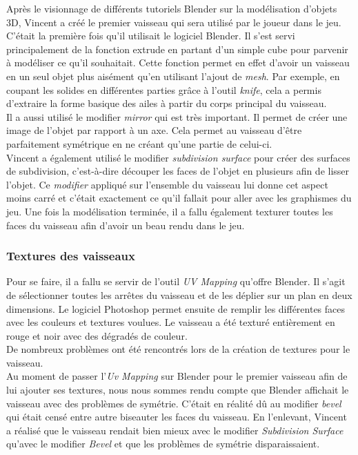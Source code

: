 \documentclass[12pt, titlepage]{article}
\begin{document}
\begin{spacing}{1.5}
Après le visionnage de différents tutoriels Blender sur la modélisation d'objets 3D, Vincent a créé le premier vaisseau qui sera utilisé par le joueur dans le jeu. C'était la première fois qu'il utilisait le logiciel Blender. Il s'est servi principalement de la fonction extrude en partant d'un simple cube pour parvenir à modéliser ce qu'il souhaitait. Cette fonction permet en effet d'avoir un vaisseau en un seul objet plus aisément qu'en utilisant l'ajout de \textit{mesh}. Par exemple, en coupant les solides en différentes parties grâce à l'outil \textit{knife}, cela a permis d'extraire la forme basique des ailes à partir du corps principal du vaisseau.\\

Il a aussi utilisé le modifier \textit{mirror} qui est très important. Il permet de créer une image de l’objet par rapport à un axe. Cela permet au vaisseau d'être parfaitement symétrique en ne créant qu’une partie de celui-ci.\\

Vincent a également utilisé le modifier \textit{subdivision surface} pour créer des surfaces de subdivision, c’est-à-dire découper les faces de l’objet en plusieurs afin de lisser l’objet. Ce \textit{modifier} appliqué sur l’ensemble du vaisseau lui donne cet aspect moins carré et c’était exactement ce qu’il fallait pour aller avec les graphismes du jeu. Une fois la modélisation terminée, il a fallu également texturer toutes les faces du vaisseau afin d'avoir un beau rendu dans le jeu.\\

\subsubsection{Textures des vaisseaux}

Pour se faire, il a fallu se servir de l'outil \textit{UV Mapping} qu'offre Blender. Il s'agit de sélectionner toutes les arrêtes du vaisseau et de les déplier sur un plan en deux dimensions. Le logiciel Photoshop permet ensuite de remplir les différentes faces avec les couleurs et textures voulues. Le vaisseau a été texturé entièrement en rouge et noir avec des dégradés de couleur.\\
De nombreux problèmes ont été rencontrés lors de la création de textures pour le vaisseau.\\

Au moment de passer l’\textit{Uv Mapping} sur Blender pour le premier vaisseau afin de lui ajouter ses textures, nous nous sommes rendu compte que Blender affichait le vaisseau avec des problèmes de symétrie. C’était en réalité dû au modifier \textit{bevel} qui était censé entre autre biseauter les faces du vaisseau. En l’enlevant, Vincent a réalisé que le vaisseau rendait bien mieux avec le modifier \textit{Subdivision Surface} qu’avec le modifier \textit{Bevel} et que les problèmes de symétrie disparaissaient.\\


\end{spacing}
\end{document}
